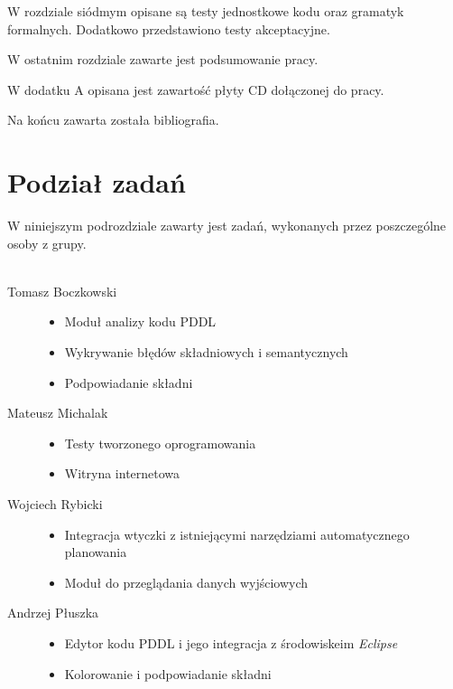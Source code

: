 W rozdziale siódmym opisane są testy jednostkowe kodu oraz gramatyk formalnych. Dodatkowo przedstawiono testy akceptacyjne.

W ostatnim rozdziale zawarte jest podsumowanie pracy.

W dodatku A opisana jest zawartość płyty CD dołączonej do pracy.

Na końcu zawarta została bibliografia.
\section{Podział zadań}
W niniejszym podrozdziale zawarty jest zadań, wykonanych przez poszczególne osoby z grupy.\\\\
\begin{description}
  \item[Tomasz Boczkowski] \hfill 
  \begin{itemize}
\item Moduł analizy kodu PDDL
\item Wykrywanie błędów składniowych i semantycznych
\item Podpowiadanie składni
\end{itemize}
  \item[Mateusz Michalak] \hfill 
    \begin{itemize}
\item Testy  tworzonego oprogramowania
\item Witryna internetowa
\end{itemize}
  \item[Wojciech Rybicki] \hfill 
    \begin{itemize}
\item Integracja wtyczki z istniejącymi narzędziami automatycznego planowania
\item Moduł do przeglądania danych wyjściowych
\end{itemize}
  \item[Andrzej Płuszka] \hfill 
    \begin{itemize}
\item Edytor kodu PDDL i jego integracja z środowiskeim \textit{Eclipse}
\item Kolorowanie i podpowiadanie składni
\end{itemize}
\end{description}




